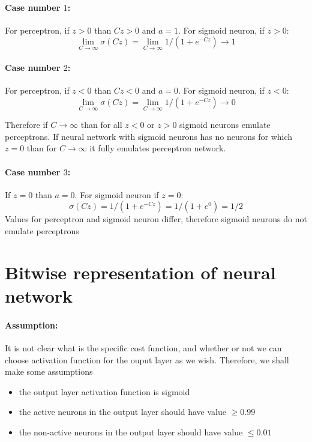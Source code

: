 \documentclass{article}
\begin{document}
\paragraph{Case number $1$:}
For perceptron, if $z > 0$ than $Cz > 0$ and $a = 1$. 
For sigmoid neuron, if $z > 0$:
$$\lim_{C \to \infty} \sigma(Cz) = \lim_{C \to \infty} 1/(1 + e^{-Cz}) \to 1$$

\paragraph{Case number $2$:}
For perceptron, if $z < 0$ than $Cz < 0$ and $a = 0$. 
For sigmoid neuron, if $z < 0$:
$$\lim_{C \to \infty} \sigma(Cz) = \lim_{C \to \infty} 1/(1 + e^{-Cz}) \to 0$$

Therefore if $C \to \infty$ than for all $z < 0$ or $z > 0$ sigmoid neurons emulate perceptrons.
If neural network with sigmoid neurons has no neurons for which $z = 0$ than for $C \to \infty$ it fully emulates perceptron network.

\paragraph{Case number $3$:}

If $z = 0$ than $a = 0$.
For sigmoid neuron if $z = 0$:
$$\sigma(Cz) = 1/(1 + e^{-Cz}) = 1/(1 + e^0) = 1/2$$
Values for perceptron and sigmoid neuron differ, therefore sigmoid neurons do not emulate perceptrons

\section{Bitwise representation of neural network}

\paragraph{Assumption:}
It is not clear what is the specific cost function, and whether or not we can choose activation function for the ouput layer as we wish.
Therefore, we shall make some assumptions
\begin{itemize}
\item the output layer activation function is sigmoid
\item the active neurons in the output layer should have value $\geq 0.99$
\item the non-active neurons in the output layer should have value $\leq 0.01$
\end{itemize}
\end{document}
